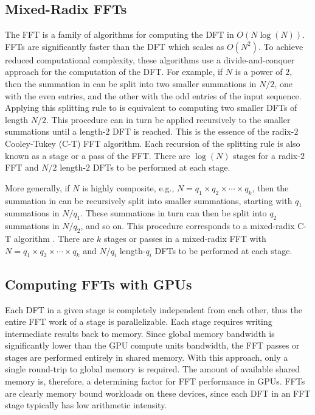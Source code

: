 \documentclass{gtac}
\theoremstyle{problemstyle}
\begin{document}
\subsection{Mixed-Radix FFTs}
The FFT is a family of algorithms for computing the DFT in $O(N \log(N))$. FFTs are significantly faster than the DFT which scales as $O(N^2)$. To achieve reduced computational complexity, these algorithms use a divide-and-conquer approach for the computation of the DFT. For example, if $N$ is a power of $2$, then the summation in  can be split into two smaller summations in $N/2$, one with the even entries, and the other with the odd entries of the input sequence. Applying this splitting rule to  is equivalent to computing two smaller DFTs of length $N/2$. This procedure can in turn be applied recursively to the smaller summations until a length-$2$ DFT is reached. This is the essence of the radix-$2$ Cooley-Tukey (C-T) FFT algorithm. Each recursion of the splitting rule is also known as a stage or a pass of the FFT. There are $\log(N)$ stages for a radix-$2$ FFT and $N/2$ length-$2$ DFTs to be performed at each stage.	

More generally, if $N$ is highly composite, e.g., $N=q_1 \times q_2 \times \cdots \times q_k$, then the summation in  can be recursively split into smaller summations, starting with $q_1$ summations in $N/q_1$. These summations in turn can then be split into $q_2$ summations in $N/q_2$, and so on. This procedure corresponds to a mixed-radix C-T algorithm \cite{vanloan92}. There are $k$ stages or passes in a mixed-radix FFT with $N=q_1 \times q_2 \times \cdots \times q_k$ and $N/q_i$ length-$q_i$ DFTs to be performed at each stage. 

\subsection{Computing FFTs with GPUs}

Each DFT in a given stage is completely independent from each other, thus the entire FFT work of a stage is parallelizable. Each stage requires writing intermediate results back to memory. Since global memory bandwidth is significantly lower than the GPU compute units bandwidth, the FFT passes or stages are performed entirely in shared memory. With this approach, only a single round-trip to global memory is required. The amount of available shared memory is, therefore, a determining factor for FFT performance in GPUs. FFTs are clearly memory bound workloads on these devices, since each DFT in an FFT stage typically has low arithmetic intensity.
\end{document}
